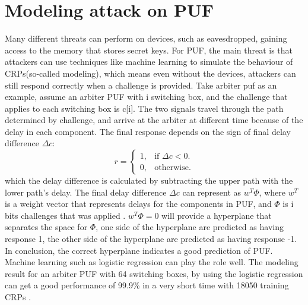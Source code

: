 \section{Modeling attack on PUF}
Many different threats can perform on devices, such as eavesdropped, gaining access to the memory that stores secret keys. For PUF, the main threat is that attackers can use techniques 
like machine learning to simulate the behaviour of CRPs(so-called modeling), which means even without the devices, attackers can still respond correctly when a challenge is 
provided. Take arbiter puf as an example, assume an arbiter PUF with i switching box, and the challenge that applies to each switching box is c[i]. The two signals travel through the 
path determined by challenge, and arrive at the arbiter at different time because of the delay in each component. The final response depends on the sign of final delay 
difference $\Delta c$:
\begin{equation}
    r =\begin{cases}
    1, & \text{if $\Delta c<0$}.\\
    0, & \text{otherwise}.
    \end{cases}
\end{equation}
which the delay difference is calculated by subtracting the upper path with the lower path's delay. The final delay difference $\Delta c$ can represent as $w^{T}\Phi$, where $w^{T}$ is 
a weight vector that represents delays for the components in PUF, and $\Phi$ is i bits challenges that was applied \cite{Reference5}. $w^{T}\Phi = 0$ will provide a hyperplane that separates the space for $\Phi$, one side of the hyperplane are predicted as having response 1, the other side of the hyperplane
are predicted as having response -1. In conclusion, the correct hyperplane indicates a good prediction of PUF. Machine learning such as logistic regression can play the role well. The modeling result for an arbiter PUF with 64 switching boxes, 
by using the logistic regression can get a good performance of 99.9\% in a very short time with 18050 training CRPs \cite{Reference6}.

